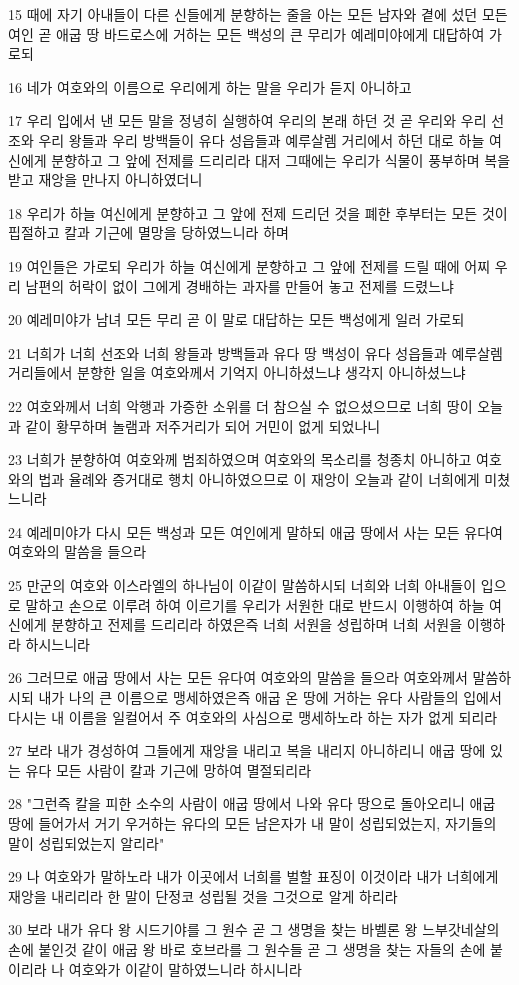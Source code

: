 \par 15 때에 자기 아내들이 다른 신들에게 분향하는 줄을 아는 모든 남자와 곁에 섰던 모든 여인 곧 애굽 땅 바드로스에 거하는 모든 백성의 큰 무리가 예레미야에게 대답하여 가로되
\par 16 네가 여호와의 이름으로 우리에게 하는 말을 우리가 듣지 아니하고
\par 17 우리 입에서 낸 모든 말을 정녕히 실행하여 우리의 본래 하던 것 곧 우리와 우리 선조와 우리 왕들과 우리 방백들이 유다 성읍들과 예루살렘 거리에서 하던 대로 하늘 여신에게 분향하고 그 앞에 전제를 드리리라 대저 그때에는 우리가 식물이 풍부하며 복을 받고 재앙을 만나지 아니하였더니
\par 18 우리가 하늘 여신에게 분향하고 그 앞에 전제 드리던 것을 폐한 후부터는 모든 것이 핍절하고 칼과 기근에 멸망을 당하였느니라 하며
\par 19 여인들은 가로되 우리가 하늘 여신에게 분향하고 그 앞에 전제를 드릴 때에 어찌 우리 남편의 허락이 없이 그에게 경배하는 과자를 만들어 놓고 전제를 드렸느냐
\par 20 예레미야가 남녀 모든 무리 곧 이 말로 대답하는 모든 백성에게 일러 가로되
\par 21 너희가 너희 선조와 너희 왕들과 방백들과 유다 땅 백성이 유다 성읍들과 예루살렘 거리들에서 분향한 일을 여호와께서 기억지 아니하셨느냐 생각지 아니하셨느냐
\par 22 여호와께서 너희 악행과 가증한 소위를 더 참으실 수 없으셨으므로 너희 땅이 오늘과 같이 황무하며 놀램과 저주거리가 되어 거민이 없게 되었나니
\par 23 너희가 분향하여 여호와께 범죄하였으며 여호와의 목소리를 청종치 아니하고 여호와의 법과 율례와 증거대로 행치 아니하였으므로 이 재앙이 오늘과 같이 너희에게 미쳤느니라
\par 24 예레미야가 다시 모든 백성과 모든 여인에게 말하되 애굽 땅에서 사는 모든 유다여 여호와의 말씀을 들으라
\par 25 만군의 여호와 이스라엘의 하나님이 이같이 말씀하시되 너희와 너희 아내들이 입으로 말하고 손으로 이루려 하여 이르기를 우리가 서원한 대로 반드시 이행하여 하늘 여신에게 분향하고 전제를 드리리라 하였은즉 너희 서원을 성립하며 너희 서원을 이행하라 하시느니라
\par 26 그러므로 애굽 땅에서 사는 모든 유다여 여호와의 말씀을 들으라 여호와께서 말씀하시되 내가 나의 큰 이름으로 맹세하였은즉 애굽 온 땅에 거하는 유다 사람들의 입에서 다시는 내 이름을 일컬어서 주 여호와의 사심으로 맹세하노라 하는 자가 없게 되리라
\par 27 보라 내가 경성하여 그들에게 재앙을 내리고 복을 내리지 아니하리니 애굽 땅에 있는 유다 모든 사람이 칼과 기근에 망하여 멸절되리라
\par 28 "그런즉 칼을 피한 소수의 사람이 애굽 땅에서 나와 유다 땅으로 돌아오리니 애굽 땅에 들어가서 거기 우거하는 유다의 모든 남은자가 내 말이 성립되었는지, 자기들의 말이 성립되었는지 알리라"
\par 29 나 여호와가 말하노라 내가 이곳에서 너희를 벌할 표징이 이것이라 내가 너희에게 재앙을 내리리라 한 말이 단정코 성립될 것을 그것으로 알게 하리라
\par 30 보라 내가 유다 왕 시드기야를 그 원수 곧 그 생명을 찾는 바벨론 왕 느부갓네살의 손에 붙인것 같이 애굽 왕 바로 호브라를 그 원수들 곧 그 생명을 찾는 자들의 손에 붙이리라 나 여호와가 이같이 말하였느니라 하시니라

